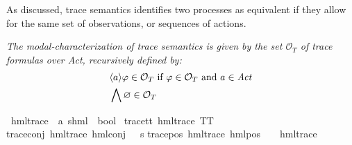 %
\begin{isabellebody}%
%
%
\isadelimtheory
%
\endisadelimtheory
%
\isatagtheory
%
\endisatagtheory
{\isafoldtheory}%
%
\isadelimtheory
%
\endisadelimtheory
%
\isadelimdocument
%
\endisadelimdocument
%
\isatagdocument
%
\isamarkuptrue%
%
\endisatagdocument
{\isafolddocument}%
%
\isadelimdocument
%
\endisadelimdocument
%
\begin{isamarkuptext}%
As discussed, trace semantics identifies two processes as equivalent if they allow for the same set of observations, or sequences of actions.%
\end{isamarkuptext}\isamarkuptrue%
%
\isadelimdocument
%
\endisadelimdocument
%
\isatagdocument
%
\isamarkuptrue%
%
\endisatagdocument
{\isafolddocument}%
%
\isadelimdocument
%
\endisadelimdocument
%
\begin{isamarkuptext}%
\textit{The \textnormal{modal-characterization of trace semantics} is given by the set $\mathcal{O}_T$ of trace formulas over Act, recursively defined by:}
\begin{align*}
&\langle a \rangle\varphi\in\mathcal{O}_T \text{ if } \varphi\in \mathcal{O}_T \text{ and }a\in\mathit{Act}\\
&\bigwedge\varnothing\in \mathcal{O}_T
\end{align*}%
\end{isamarkuptext}\isamarkuptrue%
\isamarkupfalse%
\ hml{\isacharunderscore}{\kern0pt}trace\ {\isacharcolon}{\kern0pt}{\isacharcolon}{\kern0pt}\ {\isachardoublequoteopen}{\isacharparenleft}{\kern0pt}{\isacharprime}{\kern0pt}a{\isacharcomma}{\kern0pt}\ {\isacharprime}{\kern0pt}s{\isacharparenright}{\kern0pt}hml\ {\isasymRightarrow}\ bool{\isachardoublequoteclose}\ \isanewline
trace{\isacharunderscore}{\kern0pt}tt{\isacharcolon}{\kern0pt}\ {\isachardoublequoteopen}hml{\isacharunderscore}{\kern0pt}trace\ TT{\isachardoublequoteclose}\ {\isacharbar}{\kern0pt}\isanewline
trace{\isacharunderscore}{\kern0pt}conj{\isacharcolon}{\kern0pt}\ {\isachardoublequoteopen}hml{\isacharunderscore}{\kern0pt}trace\ {\isacharparenleft}{\kern0pt}hml{\isacharunderscore}{\kern0pt}conj\ {\isacharbraceleft}{\kern0pt}{\isacharbraceright}{\kern0pt}\ {\isacharbraceleft}{\kern0pt}{\isacharbraceright}{\kern0pt}\ {\isasympsi}s{\isacharparenright}{\kern0pt}{\isachardoublequoteclose}{\isacharbar}{\kern0pt}\isanewline
trace{\isacharunderscore}{\kern0pt}pos{\isacharcolon}{\kern0pt}\ {\isachardoublequoteopen}hml{\isacharunderscore}{\kern0pt}trace\ {\isacharparenleft}{\kern0pt}hml{\isacharunderscore}{\kern0pt}pos\ {\isasymalpha}\ {\isasymphi}{\isacharparenright}{\kern0pt}{\isachardoublequoteclose}\ \ {\isachardoublequoteopen}hml{\isacharunderscore}{\kern0pt}trace\ {\isasymphi}{\isachardoublequoteclose}\isanewline

\end{isabellebody}

